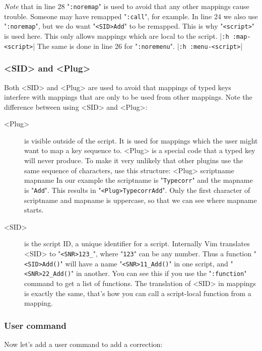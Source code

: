 \emph{Note} that in line 28 "\verb!:noremap!" is used to avoid that any other mappings cause trouble.
Someone may have remapped "\verb!:call!", for example.
In line 24 we also use "\verb!:noremap!", but we do want "\verb!<SID>Add!" to be remapped.
This is why "\verb!<script>!" is used here.
This only allows mappings which are local to the script. |\verb!:h :map-<script>!|
The same is done in line 26 for "\verb!:noremenu!".
|\verb!:h :menu-<script>!|

\subsubsection{<SID> and <Plug>}
\label{using-<Plug>}
Both <SID> and <Plug> are used to avoid that mappings of typed keys interfere with mappings that are only to be used from other mappings.
Note the difference between using <SID> and <Plug>:

\begin{description}
				\item [<Plug>]    is visible outside of the script.
								It is used for mappings which the user might want to map a key sequence to.
								<Plug> is a special code that a typed key will never produce.
								To make it very unlikely that other plugins use the same sequence of characters, use this structure: <Plug> scriptname mapname In our example the scriptname is "\verb!Typecorr!" and the mapname is "\verb!Add!".
								This results in "\verb!<Plug>TypecorrAdd!".
								Only the first character of scriptname and mapname is uppercase, so that we can see where mapname starts.

				\item [<SID>]  is the script ID, a unique identifier for a script.
								Internally Vim translates <SID> to "\verb!<SNR>123_!", where "\verb!123!" can be any number.
								Thus a function "\verb!<SID>Add()!" will have a name "\verb!<SNR>11_Add()!" in one script, and "\verb!<SNR>22_Add()!" in another.
								You can see this if you use the "\verb!:function!" command to get a list of functions.
								The translation of <SID> in mappings is exactly the same, that's how you can call a script-local function from a mapping.
\end{description}


\subsubsection{User command}
Now let's add a user command to add a correction:

